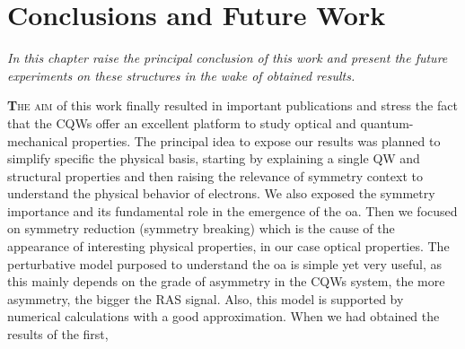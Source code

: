 \chapter{Conclusions and Future Work }
\label{chap:Intro}
\textit{In this chapter raise the principal conclusion of this work and present the future experiments on these structures in the wake of obtained results.}
\vfill
\minitoc
\newpage
\allowdisplaybreaks


\lettrine[lines=3, lraise=.1, nindent=0mm, slope=0mm]{\textbf{T}}{he aim}  of this work finally resulted in important publications and stress the fact that the \gls{CQWs} offer an excellent platform to study optical and quantum-mechanical properties.
The principal idea to expose our results was planned to simplify specific  the physical basis, starting by explaining a single \gls{QW} and structural properties and then raising the relevance of symmetry context to understand the physical behavior of electrons. We also exposed the symmetry importance and its fundamental role in the emergence of the \gls{oa}. Then we focused on symmetry reduction (symmetry breaking) which is the cause of the appearance of interesting physical properties, in our case optical properties. The perturbative model purposed to understand the \gls{oa} is simple yet very useful, as this mainly depends on the grade of asymmetry in the \gls{CQWs} system, the more asymmetry, the bigger the RAS signal. Also, this model is supported by numerical calculations with a good approximation. When we had obtained the results of the first,
